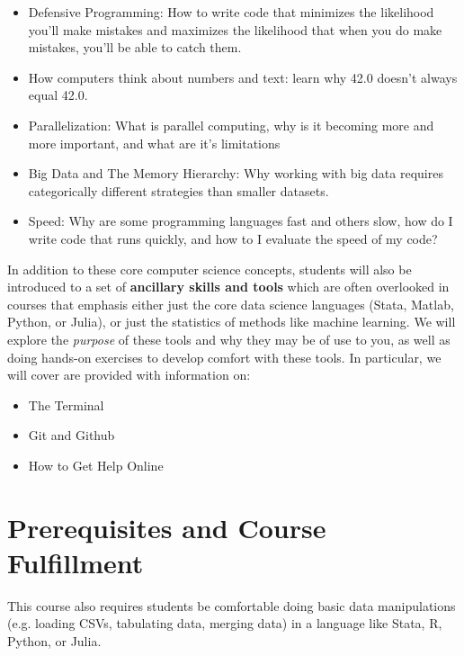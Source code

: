 \documentclass[12pt]{article}
\begin{document}
\begin{itemize}
	\item Defensive Programming: How to write code that minimizes the likelihood you'll make mistakes and maximizes the likelihood that when you do make mistakes, you'll be able to catch them.
	\item How computers think about numbers and text: learn why 42.0 doesn't always equal 42.0.
	\item Parallelization: What is parallel computing, why is it becoming more and more important, and what are it's limitations
	\item Big Data and The Memory Hierarchy: Why working with big data requires categorically different strategies than smaller datasets.
	\item Speed: Why are some programming languages fast and others slow, how do I write code that runs quickly, and how to I evaluate the speed of my code?
\end{itemize}

In addition to these core computer science concepts, students will also be introduced to a set of \textbf{ancillary skills and tools} which are often overlooked in courses that emphasis either just the core data science languages (Stata, Matlab, Python, or Julia), or just the statistics of methods like machine learning. We will explore the \emph{purpose} of these tools and why they may be of use to you, as well as doing hands-on exercises to develop comfort with these tools. In particular, we will cover are provided with information on:

\begin{itemize}
	\item The Terminal
	\item Git and Github
	\item How to Get Help Online
\end{itemize}


\section{Prerequisites and Course Fulfillment}

This course also requires students be comfortable doing basic data manipulations (e.g. loading CSVs, tabulating data, merging data) in a language like Stata, R, Python, or Julia.
\end{document}

